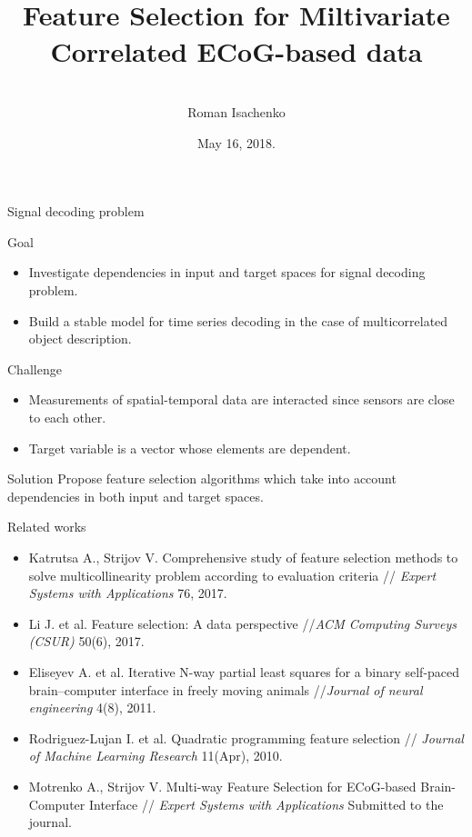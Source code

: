 \documentclass[9pt]{beamer}
\title[\hbox to 56mm{  \hfill\insertframenumber\,/\,\inserttotalframenumber}]
{\\ \vspace{1.5cm} Feature Selection for Miltivariate Correlated ECoG-based data}
\author[Roman Isachenko]{\\ 
	\vspace{.4cm}
	Roman Isachenko}
\institute[SkolTech]{Skoltech advisor: Maxim Fedorov \\ 
	\vspace{0.1cm}
	 MIPT advisor: Vadim Strijov
}
\date{May 16, 2018.}
\begin{document}
\begin{frame}
\titlepage
\end{frame}
\begin{frame}{Signal decoding problem}
	\begin{block}{Goal}
		\begin{itemize}
			\item Investigate dependencies in input and target spaces for signal decoding problem.
			\item Build a stable model for time series decoding in the case of multicorrelated object description.
		\end{itemize}
	\end{block}
	\begin{block}{Challenge}
		\begin{itemize}
			\item Measurements of spatial-temporal data are interacted since sensors are close to each other.
			\item Target variable is a vector whose elements are dependent.
		\end{itemize}
	\end{block}
	\begin{block}{Solution}
		Propose feature selection algorithms which take into account dependencies in both input and target spaces. 
	\end{block}
\end{frame}
\begin{frame}{Related works}
	\begin{itemize}
		\item Katrutsa A., Strijov V. Comprehensive study of feature selection methods to solve multicollinearity problem according to evaluation criteria // \textit{Expert Systems with Applications} 76, 2017.
		\vfill
		\item Li J. et al. Feature selection: A data perspective //\textit{ACM Computing Surveys (CSUR)} 50(6), 2017.
		\vfill
		\item Eliseyev A. et al. Iterative N-way partial least squares for a binary self-paced brain–computer interface in freely moving animals //\textit{Journal of neural engineering} 4(8), 2011.
		\vfill
		\item Rodriguez-Lujan I. et al. Quadratic programming feature selection // \textit{Journal of Machine Learning Research} 11(Apr), 2010.
		\vfill
		\item Motrenko A., Strijov V. Multi-way Feature Selection for ECoG-based Brain-Computer Interface // \textit{Expert Systems with Applications} Submitted to the journal.
	\end{itemize}
\end{frame}
\end{document}
